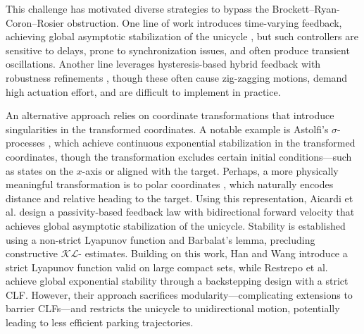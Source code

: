 \documentclass[letterpaper, 10 pt, conference]{ieeeconf}  %
\begin{document}
This challenge has motivated diverse strategies to bypass the Brockett–Ryan-Coron–Rosier obstruction. One line of work introduces time-varying feedback, achieving global asymptotic stabilization of the unicycle \cite{samson1990velocity,coron1992global_controllable,pomet1992explicit,d2019small}, but such controllers are sensitive to delays, prone to synchronization issues, and often produce transient oscillations. 
%
Another line leverages hysteresis-based hybrid feedback with robustness refinements \cite{hespanha1999_hybrid_stabilization,prieur2003robust,prieur2005robust}, though these often cause zig-zagging motions, demand high actuation effort, and are difficult to implement in practice.

An alternative approach relies on coordinate transformations that introduce singularities in the transformed coordinates. 
A notable example is Astolfi’s $\sigma$-processes \cite{astolfi1995exponential,astolfi1996discontinuous}, which achieve continuous exponential stabilization in the transformed coordinates, though the transformation excludes certain initial conditions—such as states on the $x$-axis or aligned with the target.
Perhaps, a more physically meaningful transformation is to polar coordinates \cite{astolfi1999exponential}, which naturally encodes distance and relative heading to the target. Using this representation, Aicardi et al.\cite{aicardi1995} design a passivity-based feedback law with bidirectional forward velocity that achieves global asymptotic stabilization of the unicycle. Stability is established using a non-strict Lyapunov function and Barbalat’s lemma, precluding constructive $\mathcal{KL}$- estimates. Building on this work, Han and Wang\cite{wang24_force_controlled_safestable} introduce a strict Lyapunov function valid on large compact sets, while Restrepo et al.~\cite{restrepo2020leader} achieve global exponential stability through a backstepping design with a strict CLF. However, their approach sacrifices modularity—complicating extensions to barrier CLFs—and restricts the unicycle to unidirectional motion, potentially leading to less efficient parking trajectories.
\end{document}
